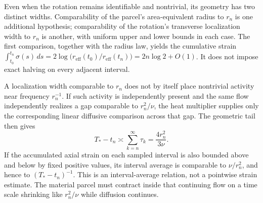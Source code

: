 Even when the rotation remains identifiable and nontrivial, its geometry has two distinct widths. Comparability of the parcel's area-equivalent radius to \(r_n\) is one additional hypothesis; comparability of the rotation's transverse localization width to \(r_n\) is another, with uniform upper and lower bounds in each case. The first comparison, together with the radius law, yields the cumulative strain \(\int_{t_0}^{t_n}\sigma(s)\,ds=2\log\!\bigl(r_{\mathrm{eff}}(t_0)/r_{\mathrm{eff}}(t_n)\bigr)=2n\log2+O(1)\). It does not impose exact halving on every adjacent interval.

A localization width comparable to \(r_n\) does not by itself place nontrivial activity near frequency \(r_n^{-1}\). If such activity is independently present and the same flow independently realizes a gap comparable to \(r_n^2/\nu\), the heat multiplier supplies only the corresponding linear diffusive comparison across that gap. The geometric tail then gives
\[
  T_*-t_n
  \asymp
  \sum_{k=n}^{\infty}\tau_k
  =
  \frac{4r_n^2}{3\nu}.
\]
If the accumulated axial strain on each sampled interval is also bounded above and below by fixed positive values, its interval average is comparable to \(\nu/r_n^2\), and hence to \((T_*-t_n)^{-1}\). This is an interval-average relation, not a pointwise strain estimate. The material parcel must contract inside that continuing flow on a time scale shrinking like \(r_n^2/\nu\) while diffusion continues.

